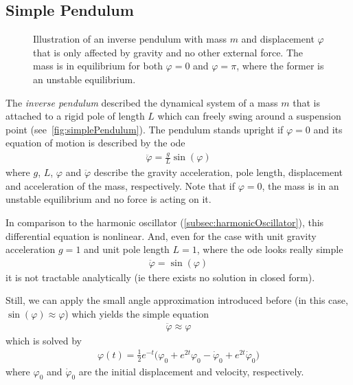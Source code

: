 		\subsection{Simple Pendulum}
			\label{subsec:simplePendulum}

			\begin{figure}
				\centering
				\tikzSimplePendulum
				\caption{Illustration of an inverse pendulum with mass \(m\) and displacement \(\varphi\) that is only affected by gravity and no other external force. The mass is in equilibrium for both \( \varphi = 0 \) and \( \varphi = \pi \), where the former is an unstable equilibrium.}
				\label{fig:simplePendulum}
			\end{figure}

			The \emph{inverse pendulum} described the dynamical system of a mass \(m\) that is attached to a rigid pole of length \(L\) which can freely swing around a suspension point (see~\autoref{fig:simplePendulum}). The pendulum stands upright if \( \varphi = 0 \) and its equation of motion is described by the \ac{ode}
			\begin{align*}
				\ddot{\varphi} = \frac{g}{L} \sin(\varphi)
			\end{align*}
			where \(g\), \(L\), \(\varphi\) and \(\ddot{\varphi}\) describe the gravity acceleration, pole length, displacement and acceleration of the mass, respectively. Note that if \( \varphi = 0 \), the mass is in an unstable equilibrium and no force is acting on it.

			In comparison to the harmonic oscillator (\autoref{subsec:harmonicOscillator}), this differential equation is nonlinear. And, even for the case with unit gravity acceleration \( g = 1 \) and unit pole length \( L = 1\), where the \ac{ode} looks really simple
			\begin{align}
				\ddot{\varphi} = \sin(\varphi)  \label{eq:inversePendulum}
			\end{align}
			it is not tractable analytically (\ac{ie} there exists no solution in closed form).

			Still, we can apply the small angle approximation introduced before (in this case, \( \sin(\varphi) \approx \varphi \)) which yields the simple equation
			\begin{align}
				\ddot{\varphi} \approx \varphi  \label{eq:linearizedInversePendulum}
			\end{align}
			which is solved by
			\begin{align*}
				\varphi(t) = \frac{1}{2} e^{-t} \big(\varphi_0 + e^{2t} \varphi_0 - \dot{\varphi}_0 + e^{2t} \dot{\varphi}_0\big)
			\end{align*}
			where \(\varphi_0\) and \(\dot{\varphi}_0\) are the initial displacement and velocity, respectively.

